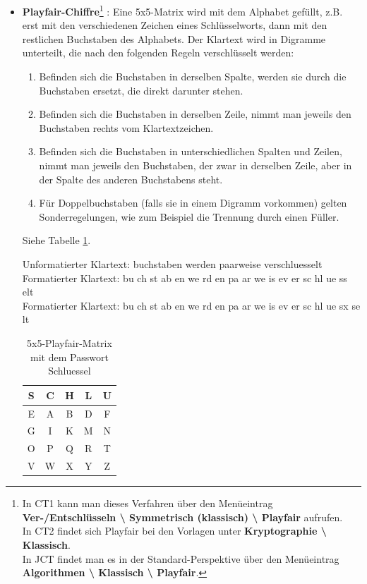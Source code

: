 \begin{refsegment}
\begin{itemize}
   \hypertarget{playfair}{}
\item \textbf{Playfair-Chiffre}\footnote{In CT1
   kann man dieses Verfahren über den Menüeintrag \textbf{Ver-/Entschlüsseln
   \textbackslash{} Symmetrisch (klassisch) \textbackslash{} Playfair}
   aufrufen.\\
   In CT2 findet sich Playfair bei den Vorlagen unter
   \textbf{Kryptographie \textbackslash{} Klassisch}.\\
   In JCT findet man es in der Standard-Perspektive
   über den Menüeintrag \textbf{Algorithmen \textbackslash{} Klassisch \textbackslash{}
   Playfair}.
   }
   \cite{Singh2001}:
   Eine 5x5-Matrix wird mit dem Alphabet gefüllt, z.B. erst mit den
   verschiedenen Zeichen eines Schlüsselworts, dann mit den restlichen
   Buchstaben des Alphabets. Der Klartext wird in Digramme unterteilt, die
   nach den folgenden Regeln verschlüsselt werden:
   \begin{enumerate}
      \item Befinden sich die Buchstaben in derselben Spalte, werden sie durch
         die Buchstaben ersetzt, die direkt darunter stehen.
      \item Befinden sich die Buchstaben in derselben Zeile, nimmt man jeweils
         den Buchstaben rechts vom Klartextzeichen.
      \item Befinden sich die Buchstaben in unterschiedlichen Spalten und
         Zeilen, nimmt man jeweils den Buchstaben, der zwar in derselben
         Zeile, aber in der Spalte des anderen Buchstabens steht.
      \item Für Doppelbuchstaben (falls sie in einem Digramm vorkommen)
         gelten Sonderregelungen, wie zum Beispiel
         die Trennung durch einen Füller.
   \end{enumerate}

   Siehe Tabelle \ref{Playfair-table-reference}.

   Unformatierter Klartext: buchstaben werden paarweise verschluesselt\\
   Formatierter Klartext:   bu ch st ab en we rd en pa ar we is ev er sc hl ue ss elt\\
   Formatierter Klartext:   bu ch st ab en we rd en pa ar we is ev er sc hl ue sx se lt

   \begin{table}[ht]
   \begin{center}
   \begin{tabular}{|c|c|c|c|c|}
   \hline
	S & C & H & L & U\\
   \hline
	E & A & B & D & F\\
   \hline
	G & I & K & M & N\\
   \hline
	O & P & Q & R & T\\
   \hline
	V & W & X & Y & Z\\
   \hline
   \end{tabular}
   \caption{5x5-Playfair-Matrix mit dem Passwort \glqq Schluessel\grqq}
   \label{Playfair-table-reference}
   \end{center}
   \end{table}


\end{itemize}
\end{refsegment}

